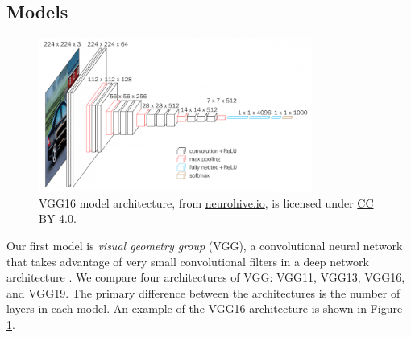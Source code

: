 \documentclass[12pt]{article}
\begin{document}
\subsection{Models}

\begin{figure}
    \centering
    \includegraphics[width=0.8\textwidth]{assets/images/vgg16_architecture.png}
    \caption{VGG16 model architecture, from
        \href{https://neurohive.io/en/}{neurohive.io}, is licensed under
        \href{https://creativecommons.org/licenses/by/4.0/}{CC BY 4.0}. }
    \label{fig:vgg_architecture}
\end{figure}

Our first model is \textit{visual geometry group} (VGG), a convolutional neural
network that takes advantage of very small convolutional filters in a deep
network architecture \cite{simonyan_very_2015}. We compare four architectures of
VGG: VGG11, VGG13, VGG16, and VGG19. The primary difference between the
architectures is the number of layers in each model. An example of the VGG16
architecture is shown in Figure \ref{fig:vgg_architecture}.
\end{document}
